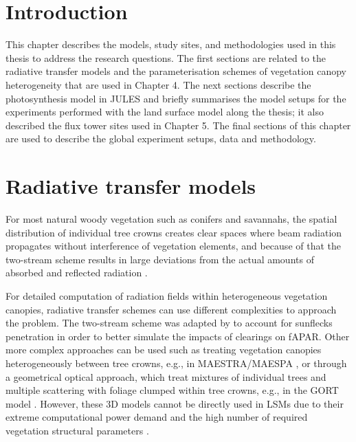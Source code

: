 \section{Introduction}\label{introduction}

This chapter describes the models, study sites, and methodologies used in this thesis to address the research questions. The first sections are related to the radiative transfer models and the parameterisation schemes of vegetation canopy heterogeneity that are used in Chapter 4. The next sections describe the photosynthesis model in JULES and briefly summarises the model setups for the experiments performed with the land surface model along the thesis; it also described the flux tower sites used in Chapter 5. The final sections of this chapter are used to describe the global experiment setups, data and methodology. 

\section{Radiative transfer models}\label{section:RTMs}

For most natural woody vegetation such as conifers and savannahs, the spatial distribution of individual tree crowns creates clear spaces where beam radiation propagates without interference of vegetation elements, and because of that the two-stream scheme results in large deviations from the actual amounts of absorbed and reflected radiation \citep{Ni-Meister2010,Kobayashi2012,loew2014}.

For detailed computation of radiation fields within heterogeneous vegetation canopies, radiative transfer schemes can use different complexities to approach the problem. The two-stream scheme was adapted by \citet{Dai2004} to account for sunflecks penetration in order to better simulate the impacts of clearings on fAPAR. Other more complex approaches can be used such as treating vegetation canopies heterogeneously between tree crowns, e.g., in MAESTRA/MAESPA \citep{Wang1990,Duursma2012}, or through a geometrical optical approach, which treat mixtures of individual trees and multiple scattering with foliage clumped within tree crowns, e.g., in the GORT model \citep{Li1995}. However, these 3D models cannot be directly used in LSMs due to their extreme computational power demand \citep{Yang2001} and the high number of required vegetation structural parameters \citep{loew2014}.

